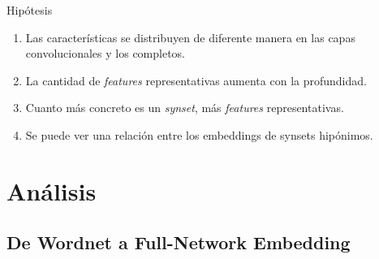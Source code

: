 \documentclass{beamer}
\begin{document}
\begin{frame}{Hipótesis}
\begin{enumerate}
\item \label{h1} Las características se distribuyen de diferente manera en las capas convolucionales y los completos. 
\item \label{h3} La cantidad de \textit{features} representativas aumenta con la profundidad.
\item \label{h2} Cuanto más concreto es un \textit{synset}, más \textit{features} representativas.
\item \label{h4} Se puede ver una relación entre los embeddings de synsets hipónimos. 
\end{enumerate}

\end{frame}

\section{Análisis}

\subsection{De Wordnet a Full-Network Embedding}
\end{document}
